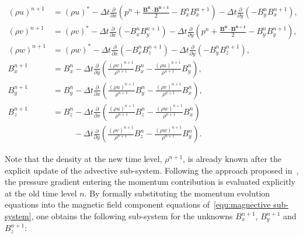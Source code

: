 \documentclass[a4paper,fleqn]{cas-sc}
\theoremstyle{definition}
\theoremstyle{remark}
\begin{document}
\clearpage
\begin{equation}
    \label{equ:discreteofB}
    \begin{aligned}
        (\rho u) ^ {n+1} &= (\rho u) ^ {*} - \Delta t \frac{\partial}{\partial x}(p^n + \frac{\mathbf{B^n} \cdot \mathbf{B^{n + 1}}}{2} - B_x^n B_x^{n+1}) - \Delta t \frac{\partial}{\partial y} (-B_y ^nB_x^{n + 1}),\\
        (\rho v) ^ {n+1} &= (\rho v) ^ {*} - \Delta t \frac{\partial}{\partial x} (-B_x^n B_y^{n+1}) - \Delta t \frac{\partial}{\partial y}(p^n + \frac{\mathbf{B^n} \cdot \mathbf{B^{n + 1}}}{2} - B_y^n B_y^{n+1}), \\
        (\rho w) ^ {n+1} &= (\rho w) ^ {*} - \Delta t \frac{\partial}{\partial x} (-B_x^n B_z^{n+1}) - \Delta t \frac{\partial}{\partial y} (-B_y ^nB_z^{n + 1}),\\
        B^{n+1}_x &= B^{n}_x - \Delta t \frac{\partial}{\partial y} (\frac{(\rho v)^{n+1}}{\rho ^{n+1}} B_x^n - \frac{(\rho u)^{n+1}}{\rho ^{n+1}} B_y^n),\\
        B^{n+1}_y &= B^{n}_y - \Delta t \frac{\partial}{\partial x} (\frac{(\rho u)^{n+1}}{\rho ^{n+1}} B_y^n - \frac{(\rho v)^{n+1}}{\rho ^{n+1}} B_x^n), \\
       B^{n+1}_z &= B^{n}_z - \Delta t \frac{\partial}{\partial x}\!\left(
                \frac{(\rho u)^{n+1}}{\rho^{n+1}} B_z^n 
                - \frac{(\rho w)^{n+1}}{\rho^{n+1}} B_x^n
              \right) \\
        &\quad \quad \; \; - \Delta t \frac{\partial}{\partial y}\!\left(
                \frac{(\rho v)^{n+1}}{\rho^{n+1}} B_z^n 
                - \frac{(\rho w)^{n+1}}{\rho^{n+1}} B_y^n
              \right).
    \end{aligned}
\end{equation}




Note that the density at the new time level, $\rho^{n+1}$, is already known after the
explicit update of the advective sub-system. Following the approach proposed
in~\cite{BoscheriThomann2024}, the pressure gradient entering the momentum
contribution is evaluated explicitly at the old time level $n$. By formally
substituting the momentum evolution equations into the
magnetic field component equations of~\eqref{equ:magnective sub-system}, one obtains the
following sub-system for the unknowns $B_x^{n+1}$, $B_y^{n+1}$ and $B_z^{n+1}$:
\end{document}
